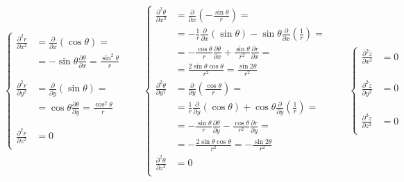 \documentclass
[
a4paper,                      %
twoside,					  %
12pt,                         %
abstract,		      %
fleqn,                        %
]
{scrartcl} %
\begin{document}
\begin{description}
\begin{equation}
\begin{cases}
\frac{\partial^{2} r}{\partial x^{2}}&=\frac{\partial}{\partial x}\left(\cos{\theta}\right)=\\&=-\sin{\theta}\frac{\partial \theta}{\partial x}=\frac{\sin^{2}{\theta}}{r}\\&\\&\\
\frac{\partial^{2} r}{\partial y^{2}}&=\frac{\partial}{\partial y}\left(\sin{\theta}\right)=\\&=\cos{\theta}\frac{\partial \theta}{\partial y}=\frac{\cos^{2}{\theta}}{r}\\&\\&\\
\frac{\partial^{2} r}{\partial z^{2}}&=0\\
\end{cases}\qquad\begin{cases}
\frac{\partial^{2} \theta}{\partial x^{2}}&=\frac{\partial}{\partial x}\left(-\frac{\sin{\theta}}{r}\right)=\\&=-\frac{1}{r}\frac{\partial}{\partial x}\left(\sin{\theta}\right)-\sin{\theta}\frac{\partial}{\partial x}\left(\frac{1}{r}\right)=\\&=-\frac{\cos{\theta}}{r}\frac{\partial\theta}{\partial x}+\frac{\sin{\theta}}{r^{2}}\frac{\partial r}{\partial x}=\\&=\frac{2\sin{\theta}\cos{\theta}}{r^{2}}=\frac{\sin{2\theta}}{r^{2}}\\
\frac{\partial^{2} \theta}{\partial y^{2}}&=\frac{\partial}{\partial y}\left(\frac{\cos{\theta}}{r}\right)=\\&=\frac{1}{r}\frac{\partial}{\partial y}\left(\cos{\theta}\right)+\cos{\theta}\frac{\partial}{\partial y}\left(\frac{1}{r}\right)=\\&=-\frac{\sin{\theta}}{r}\frac{\partial\theta}{\partial y}-\frac{\cos{\theta}}{r^{2}}\frac{\partial r}{\partial y}=\\&=-\frac{2\sin{\theta}\cos{\theta}}{r^{2}}=-\frac{\sin{2\theta}}{r^{2}}\\
\frac{\partial^{2} \theta}{\partial z^{2}}&=0\\
\end{cases}\qquad\begin{cases}
\frac{\partial^{2} \tilde{z}}{\partial x^{2}}&=0\\&\\&\\&\\
\frac{\partial^{2} \tilde{z}}{\partial y^{2}}&=0\\&\\&\\&\\
\frac{\partial^{2} \tilde{z}}{\partial z^{2}}&=0\\
\end{cases}
\end{equation}


\end{description}
\end{document}
